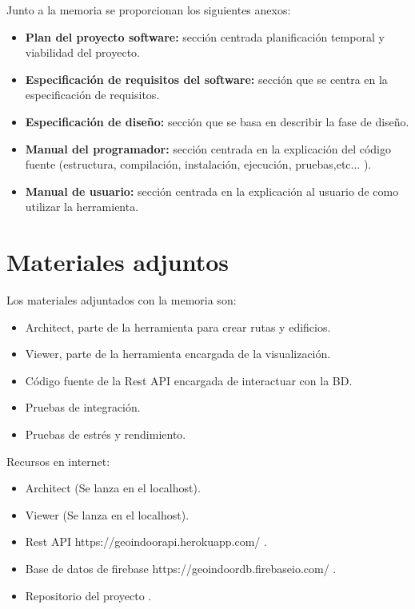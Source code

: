 Junto a la memoria se proporcionan los siguientes anexos:

\begin{itemize}
\tightlist
\item
  \textbf{Plan del proyecto software:} sección centrada planificación temporal y viabilidad del proyecto.
\item
  \textbf{Especificación de requisitos del software:} sección que se centra en la especificación de requisitos.
\item
  \textbf{Especificación de diseño:} sección que se basa en describir la fase de diseño.
\item
  \textbf{Manual del programador:} sección centrada en la explicación del código fuente (estructura, compilación,
  instalación, ejecución, pruebas,etc... ).
\item
  \textbf{Manual de usuario:} sección centrada en la explicación al usuario de como utilizar la herramienta.
\end{itemize}

\section{Materiales adjuntos}\label{materiales-adjuntos}

Los materiales adjuntados con la memoria son: 

\begin{itemize}
\tightlist
\item
	Architect, parte de la herramienta para crear rutas y edificios.
\item
	Viewer, parte de la herramienta encargada de la visualización.
\item	
	Código fuente de la Rest API encargada de interactuar con la BD.
\item	
	Pruebas de integración.
\item	
	Pruebas de estrés y rendimiento.
\end{itemize}

Recursos en internet:

\begin{itemize}
\tightlist
\item
  Architect (Se lanza en el localhost).
\item
  Viewer (Se lanza en el localhost).
\item
  Rest API https://geoindoorapi.herokuapp.com/ .
\item
  Base de datos de firebase  https://geoindoordb.firebaseio.com/ .
\item
  Repositorio del proyecto .
\end{itemize}
